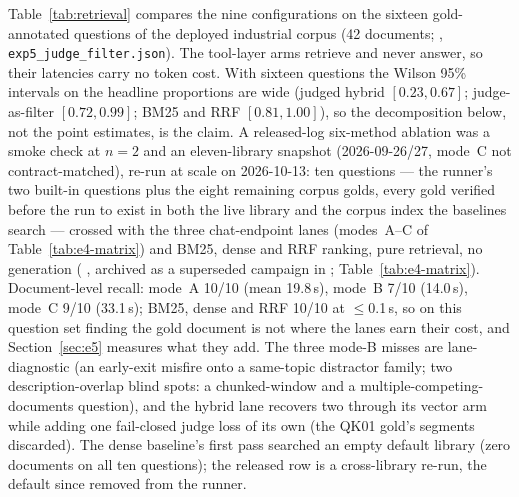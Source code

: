 Table~\ref{tab:retrieval} compares the nine configurations on the sixteen
gold-annotated questions of the deployed industrial corpus (42 documents;
,
\texttt{exp5\_judge\_filter.json}). The tool-layer arms retrieve and never
answer, so their latencies carry no token cost. With sixteen questions the
Wilson 95\% intervals on the headline proportions are wide (judged hybrid
$[0.23, 0.67]$; judge-as-filter $[0.72, 0.99]$; BM25 and RRF
$[0.81, 1.00]$), so the decomposition below, not the point estimates, is
the claim. A released-log six-method ablation was a smoke check at
$n = 2$ and an eleven-library snapshot (2026-09-26/27, mode~C not
contract-matched), re-run at scale on
2026-10-13: ten questions --- the runner's two built-in questions plus the
eight remaining corpus golds, every gold verified before the run to exist in
both the live library and the corpus index the baselines search --- crossed
with the three chat-endpoint lanes (modes~A--C of
Table~\ref{tab:e4-matrix}) and BM25, dense and RRF ranking, pure retrieval,
no generation
(
, archived as a
superseded campaign in
;
Table~\ref{tab:e4-matrix}). Document-level
recall: mode~A 10/10 (mean 19.8\,s), mode~B 7/10 (14.0\,s), mode~C 9/10
(33.1\,s); BM25, dense and RRF 10/10 at $\leq$0.1\,s, so on this question set
finding the gold document is not where the lanes earn their cost, and
Section~\ref{sec:e5} measures what they add. The three mode-B misses are
lane-diagnostic (an early-exit misfire onto a same-topic distractor family;
two description-overlap blind spots: a chunked-window and a
multiple-competing-documents question), and the hybrid lane recovers two
through its vector arm while adding one fail-closed judge loss of its own
(the QK01 gold's segments discarded). The dense baseline's first pass
searched an empty default library (zero documents on all ten questions); the
released row is a cross-library re-run, the default since removed from the
runner.

